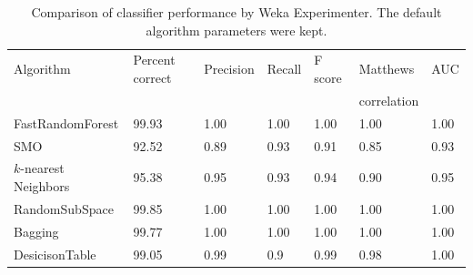 \documentclass[paper=A4,bibliography=totocnumbered]{scrartcl}
\begin{document}
\begin{table}[htbp]
	\centering
	\caption{Comparison of classifier performance by Weka Experimenter. The default algorithm parameters were kept.}
	\begin{tabular}{lllllll}
		\toprule
		Algorithm & Percent correct & Precision & Recall & F score & Matthews  & AUC \\
		 & & & & & correlation & \\
		 \midrule
		FastRandomForest & 99.93 & 1.00 & 1.00 & 1.00 & 1.00 & 1.00 \\
		SMO & 92.52 & 0.89 & 0.93 & 0.91 & 0.85 & 0.93 \\
		$k$-nearest Neighbors & 95.38 & 0.95 & 0.93 & 0.94 & 0.90 & 0.95 \\
		RandomSubSpace & 99.85 & 1.00 & 1.00 & 1.00 & 1.00 & 1.00 \\
		Bagging & 99.77 & 1.00 & 1.00 & 1.00 & 1.00 & 1.00 \\
		DesicisonTable & 99.05 & 0.99 & 0.9 & 0.99 & 0.98 & 1.00 \\
		\bottomrule
	\end{tabular}
	\label{tab:weka}
\end{table}
\end{document}
